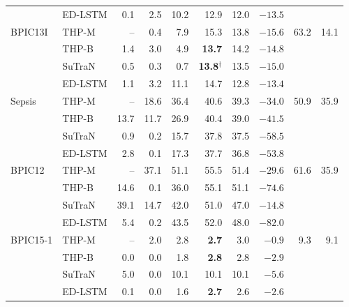 \begin{tabular}{llrrrrrrrr}
 & ED-LSTM & 0.1 & 2.5 & 10.2 & 12.9 & 12.0 & $-13.5$ &  &  \\
BPIC13I & THP-M & -- & 0.4 & 7.9 & 15.3 & 13.8 & $-15.6$ & 63.2 & 14.1 \\
 & THP-B & 1.4 & 3.0 & 4.9 & \textbf{13.7} & 14.2 & $-14.8$ &  &  \\
 & SuTraN & 0.5 & 0.3 & 0.7 & \textbf{13.8$^\dagger$} & 13.5 & $-15.0$ &  &  \\
 & ED-LSTM & 1.1 & 3.2 & 11.1 & 14.7 & 12.8 & $-13.4$ &  &  \\
Sepsis & THP-M & -- & 18.6 & 36.4 & 40.6 & 39.3 & $-34.0$ & 50.9 & 35.9 \\
 & THP-B & 13.7 & 11.7 & 26.9 & 40.4 & 39.0 & $-41.5$ &  &  \\
 & SuTraN & 0.9 & 0.2 & 15.7 & 37.8 & 37.5 & $-58.5$ &  &  \\
 & ED-LSTM & 2.8 & 0.1 & 17.3 & 37.7 & 36.8 & $-53.8$ &  &  \\
BPIC12 & THP-M & -- & 37.1 & 51.1 & 55.5 & 51.4 & $-29.6$ & 61.6 & 35.9 \\
 & THP-B & 14.6 & 0.1 & 36.0 & 55.1 & 51.1 & $-74.6$ &  &  \\
 & SuTraN & 39.1 & 14.7 & 42.0 & 51.0 & 47.0 & $-14.8$ &  &  \\
 & ED-LSTM & 5.4 & 0.2 & 43.5 & 52.0 & 48.0 & $-82.0$ &  &  \\
BPIC15-1 & THP-M & -- & 2.0 & 2.8 & \textbf{2.7} & 3.0 & $-0.9$ & 9.3 & 9.1 \\
 & THP-B & 0.0 & 0.0 & 1.8 & \textbf{2.8} & 2.8 & $-2.9$ &  &  \\
 & SuTraN & 5.0 & 0.0 & 10.1 & 10.1 & 10.1 & $-5.6$ &  &  \\
 & ED-LSTM & 0.1 & 0.0 & 1.6 & \textbf{2.7} & 2.6 & $-2.6$ &  &  \\
\bottomrule
\end{tabular}

